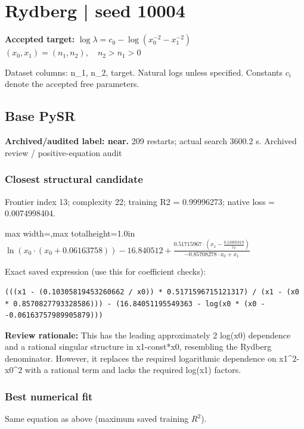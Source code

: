 \documentclass[10pt,letterpaper,landscape]{article}
\begin{document}
\section*{Rydberg | seed 10004}
\textbf{Accepted target:} $\displaystyle \log\lambda=c_0-\log\!\left(x_0^{-2}-x_1^{-2}\right)$\hfill $(x_0,x_1)=(n_1,n_2),\quad n_2>n_1>0$\par
{\small Dataset columns: n\_1, n\_2, target. Natural logs unless specified. Constants $c_i$ denote the accepted free parameters.}\par\medskip
\begin{minipage}[t]{0.485\textwidth}
\subsection*{Base PySR}
\textbf{Archived/audited label: near.} 209 restarts; actual search 3600.2 s.
{\small Archived review / positive-equation audit}
\subsubsection*{Closest structural candidate}
Frontier index 13; complexity 22; training R2 = 0.99996273; native loss = 0.0074998404.
\begin{center}\begin{adjustbox}{max width=\linewidth,max totalheight=1.0in}$\displaystyle \ln{\left(x_{0} \cdot \left(x_{0} + 0.06163758\right) \right)} - 16.840512 + \frac{0.51715967 \cdot \left(x_{1} - \frac{0.10305819}{x_{0}}\right)}{- 0.85708278 \cdot x_{0} + x_{1}}$\end{adjustbox}\end{center}
{\scriptsize Exact saved expression (use this for coefficient checks):}
\begin{lstlisting}
(((x1 - (0.10305819453260662 / x0)) * 0.5171596715121317) / (x1 - (x0 * 0.8570827793328586))) - (16.84051195549363 - log(x0 * (x0 - -0.06163757989905879)))
\end{lstlisting}
{\small\textbf{Review rationale:} This has the leading approximately 2 log(x0) dependence and a rational singular structure in x1-const*x0, resembling the Rydberg denominator. However, it replaces the required logarithmic dependence on x1\textasciicircum{}2-x0\textasciicircum{}2 with a rational term and lacks the required log(x1) factors.}
\subsubsection*{Best numerical fit}
Same equation as above (maximum saved training $R^2$).
\end{minipage}\hfill
\end{document}
